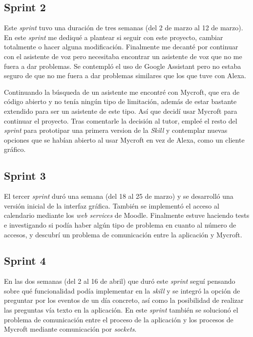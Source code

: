 \subsection{Sprint 2}

Este \textit{sprint} tuvo una duración de tres semanas (del 2 de marzo al 12 de marzo). En este \textit{sprint} me dediqué a plantear si seguir con este proyecto, cambiar totalmente o hacer alguna modificación. Finalmente me decanté por continuar con el asistente de voz pero necesitaba encontrar un asistente de voz que no me fuera a dar problemas. Se contempló el uso de Google Assistant pero no estaba seguro de que no me fuera a dar problemas similares que los que tuve con Alexa.

Continuando la búsqueda de un asistente me encontré con Mycroft, que era de código abierto y no tenía ningún tipo de limitación, además de estar bastante extendido para ser un asistente de este tipo. Así que decidí usar Mycroft para continuar el proyecto.
Tras comentarle la decisión al tutor, empleé el resto del \textit{sprint} para prototipar una primera version de la \textit{Skill} y contemplar nuevas opciones que se habían abierto al usar Mycroft en vez de Alexa, como un cliente gráfico.

 

\subsection{Sprint 3}

El tercer \textit{sprint} duró una semana (del 18 al 25 de marzo) y se desarrolló una versión inicial de la interfaz gráfica. También se implementó el acceso al calendario mediante los \textit{web services} de Moodle. Finalmente estuve haciendo tests e investigando si podía haber algún tipo de problema en cuanto al número de accesos, y descubrí un problema de comunicación entre la aplicación y Mycroft.

 

\subsection{Sprint 4}

En las dos semanas (del 2 al 16 de abril) que duró este \textit{sprint} seguí pensando sobre qué funcionalidad podía implementar en la \textit{skill} y se integró la opción de preguntar por los eventos de un día concreto, así como la posibilidad de realizar las preguntas vía texto en la aplicación. En este \textit{sprint} también se solucionó el problema de comunicación entre el proceso de la aplicación y los procesos de Mycroft mediante comunicación por \textit{sockets}.

